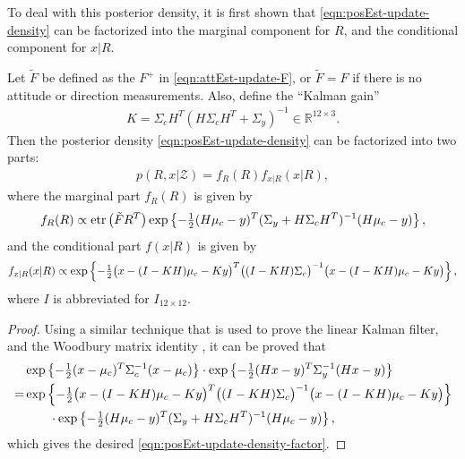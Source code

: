 To deal with this posterior density, it is first shown that \eqref{eqn:posEst-update-density} can be factorized into the marginal component for $R$, and the conditional component for $x|R$.
\begin{lemma}
	Let $\tilde{F}$ be defined as the $F^+$ in \eqref{eqn:attEst-update-F}, or $\tilde{F} = F$ if there is no attitude or direction measurements.
	Also, define the ``Kalman gain''
	\begin{align}
		K = \Sigma_cH^T(H\Sigma_cH^T + \Sigma_y)^{-1} \in \mathbb{R}^{12\times 3}.
	\end{align}
	Then the posterior density \eqref{eqn:posEst-update-density} can be factorized into two parts:
	\begin{align} \label{eqn:posEst-update-density-factor}
		p(R,x|\mathcal{Z}) = f_R(R) f_{x|R}(x|R),
	\end{align}
	where the marginal part $f_R(R)$ is given by
	\begin{align} \label{eqn:posEst-update-density-R}
		f_R(R) \propto \mathrm{etr}\left( \tilde{F}R^T \right) \exp\left\{ -\tfrac{1}{2}(H\mu_c-y)^T (\Sigma_y+H\Sigma_cH^T)^{-1} (H\mu_c-y) \right\},
	\end{align}
	and the conditional part $f(x|R)$ is given by
	\begin{align} \label{eqn:posEst-update-density-x|R}
		f_{x|R}(x|R) \propto \exp\left\{ -\tfrac{1}{2} \big(x-(I-KH)\mu_c-Ky\big)^T \big((I-KH)\Sigma_c\big)^{-1} \big(x-(I-KH)\mu_c-Ky\big) \right\},
	\end{align}
	where $I$ is abbreviated for $I_{12\times 12}$.
\end{lemma}
\begin{proof}
	Using a similar technique that is used to prove the linear Kalman filter, and the Woodbury matrix identity \cite{petersen2008matrix}, it can be proved that
	\begin{align*}
		&\exp\left\{ -\tfrac{1}{2}(x-\mu_c)^T\Sigma_c^{-1}(x-\mu_c) \right\} \cdot \exp\left\{ -\tfrac{1}{2}(Hx-y)^T\Sigma_y^{-1}(Hx-y) \right\} \\
		= &\exp\left\{ -\tfrac{1}{2} \big(x-(I-KH)\mu_c-Ky\big)^T \big((I-KH)\Sigma_c\big)^{-1} \big(x-(I-KH)\mu_c-Ky\big) \right\} \\
		&\qquad \cdot \exp\left\{ -\tfrac{1}{2}(H\mu_c-y)^T (\Sigma_y+H\Sigma_cH^T)^{-1} (H\mu_c-y) \right\},
	\end{align*}
	which gives the desired \eqref{eqn:posEst-update-density-factor}.
\end{proof}

